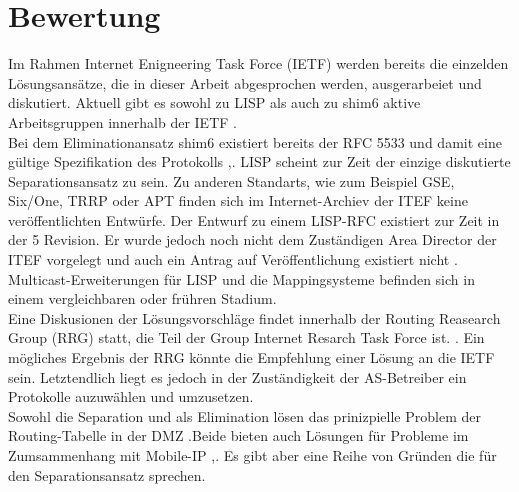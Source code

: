 \section{Bewertung}
Im Rahmen Internet Enigneering Task Force (IETF) werden bereits die einzelden Lösungsansätze, die in dieser Arbeit abgesprochen werden, ausgerarbeiet und diskutiert. Aktuell gibt es sowohl zu LISP als auch zu shim6 aktive Arbeitsgruppen innerhalb der IETF \cite{ietf:groups}. \\

Bei dem Eliminationansatz shim6 existiert bereits der RFC 5533 und damit eine gültige Spezifikation des Protokolls \cite{nordmark:2009:RFC5533},\cite{ietf:documents}. LISP scheint zur Zeit der einzige diskutierte Separationsansatz zu sein. Zu anderen Standarts, wie zum Beispiel GSE, Six/One, TRRP oder APT finden sich im Internet-Archiev der ITEF keine veröffentlichten Entwürfe. Der Entwurf zu einem LISP-RFC \cite{farinacci:2009:LISP} existiert zur Zeit in der 5 Revision. Er wurde jedoch noch nicht dem Zuständigen Area Director der ITEF vorgelegt und auch ein Antrag auf Veröffentlichung existiert nicht \cite{ietf:documents}.  Multicast-Erweiterungen für LISP und die Mappingsysteme befinden sich in einem vergleichbaren oder frühren Stadium. \\

Eine Diskusionen der Lösungsvorschläge findet innerhalb der Routing Reasearch Group (RRG) statt, die Teil der Group Internet Resarch Task Force ist. \cite{irtf:rrg}. Ein mögliches Ergebnis der RRG könnte die Empfehlung einer Lösung an die IETF sein. Letztendlich liegt es jedoch in der Zuständigkeit der AS-Betreiber ein Protokolle auzuwählen und umzusetzen. \\

Sowohl die Separation und als Elimination lösen das prinizpielle Problem der Routing-Tabelle in der DMZ \cite{jen:2008:start}.Beide bieten auch Lösungen für Probleme im Zumsammenhang mit Mobile-IP \cite{farinacci:2009:LISP},\cite{nordmark:2009:RFC5533}. Es gibt aber eine Reihe von Gründen die für den Separationsansatz sprechen. \\ 


